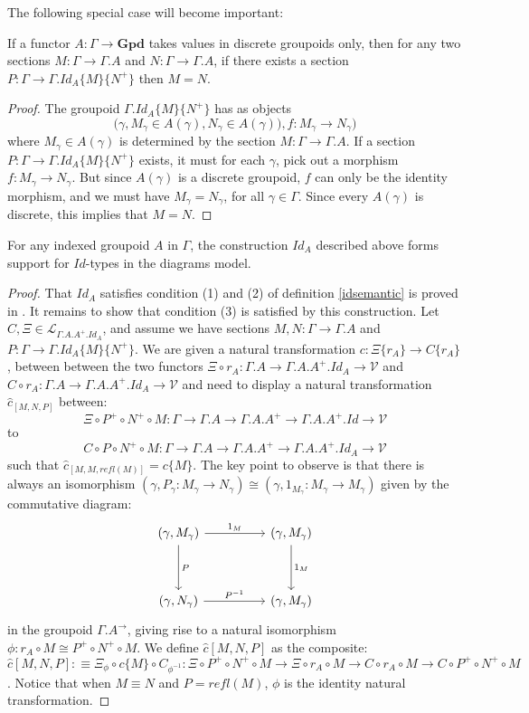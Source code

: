 The following special case will become important:
\begin{lemm}\label{discgroupoid}If a functor $A : \Gamma \to \mathbf{Gpd}$ takes values in discrete groupoids only, then for any two sections $M : \Gamma \to \Gamma.A$ and $N : \Gamma \to \Gamma.A$, if there exists a section $P : \Gamma \to \Gamma.Id_A\{M\}\{N^+\}$ then $M = N$.
\begin{proof}
The groupoid $\Gamma.Id_A\{M\}\{N^+\}$ has as objects 
\[
\big (\gamma, M_\gamma \in A(\gamma), N_\gamma \in A(\gamma)), f : M_\gamma \to N_\gamma\big )
\]
where $M_\gamma \in A(\gamma)$ is determined by the section $M : \Gamma \to \Gamma.A$.
If a section $P : \Gamma \to \Gamma.Id_A\{M\}\{N^+\}$ exists, it must for each $\gamma$, pick out a morphism $f : M_\gamma \to N_\gamma$. But since $A(\gamma)$ is a discrete groupoid, $f$ can only be the identity morphism, and we must have $M_\gamma = N_\gamma$, for all $\gamma \in \Gamma$. Since every $A(\gamma)$ is discrete, this implies that $M = N$.
\end{proof}
\end{lemm}
\begin{thm}For any indexed groupoid $A$ in $\Gamma$, the construction $Id_A$ described above forms support for $Id$-types in the diagrams model.
  \begin{proof}That $Id_A$ satisfies condition (1) and (2) of definition \ref{idsemantic} is proved in \cite{hofmann1998}. It remains to show that condition (3) is satisfied by this construction. Let $C, \Xi \in \mathcal{L}_{\Gamma.A.A^+.Id_A}$, and assume we have sections $M, N : \Gamma \to \Gamma.A$ and $P : \Gamma \to \Gamma.Id_A\{M\}\{N^+\}$. We are given a natural transformation $c : \Xi\{r_A\} \to C\{r_A\}$, between between the two functors $\Xi \circ r_A: \Gamma.A \to \Gamma.A.A^+.Id_A \to \mathcal{V}$ and $C \circ r_A : \Gamma.A \to \Gamma.A.A^+.Id_A \to \mathcal{V}$ and need to display a natural transformation $\hat c_{[M,N,P]}$ between:
    \[
      \Xi \circ P^+ \circ N^+ \circ M: \Gamma \to \Gamma.A \to\Gamma.A.A^+ \to \Gamma.A.A^+.Id \to \mathcal{V}
    \]
    to
    \[
      C \circ P \circ N^+ \circ M : \Gamma \to \Gamma.A \to \Gamma.A.A^+ \to \Gamma.A.A^+.Id_A \to \mathcal{V}
    \]
    such that $\hat c_{[M, M, refl(M)]} = c\{M\}$.
    The key point to observe is that there is always an isomorphism $(\gamma, P_\gamma : M_\gamma \to N_\gamma) \cong (\gamma, 1_{M_\gamma} : M_\gamma \to M_\gamma)$ given by the commutative diagram:
    \[
      \ti
      (\gamma, M_\gamma) \ar[d, "P"] \ar[r, "1_M"] & (\gamma, M_\gamma) \ar[d, "1_M"]\\
      (\gamma, N_\gamma) \ar[r, "P^{-1}"] & (\gamma, M_\gamma)
      \kz
    \]
    in the groupoid $\Gamma.A^\to$, giving rise to a natural isomorphism $\phi : r_A \circ M \cong P^+ \circ N^+ \circ M$. We define $\hat c[M, N, P]$ as the composite:
\[
\hat c[M,N,P] :\equiv \Xi_\phi \circ c\{M\} \circ C_{\phi^{-1}} : \Xi \circ P^+ \circ N^+ \circ M \to \Xi \circ r_A \circ M \to C \circ r_A \circ M \to C \circ P^+ \circ N^+ \circ M
\]
. Notice that when $M \equiv N$ and $P = refl(M)$, $\phi$ is the identity natural transformation.
\end{proof}
\end{thm}


